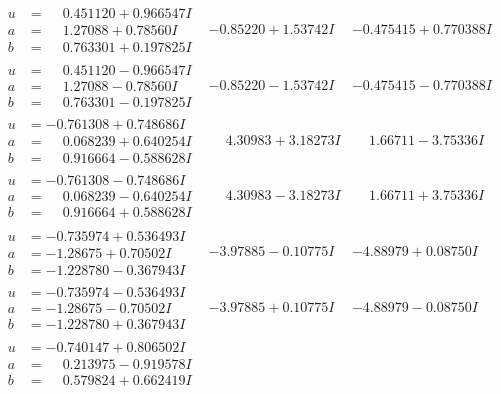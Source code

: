 \documentclass[1p]{elsarticle_modified}
\theoremstyle{definition}
\begin{document}
$$\begin{array}{c|c|c}
\begin{aligned}
u &= \phantom{-}0.451120 + 0.966547 I \\
a &= \phantom{-}1.27088 + 0.78560 I \\
b &= \phantom{-}0.763301 + 0.197825 I\end{aligned}
 & -0.85220 + 1.53742 I & -0.475415 + 0.770388 I \\ \hline\begin{aligned}
u &= \phantom{-}0.451120 - 0.966547 I \\
a &= \phantom{-}1.27088 - 0.78560 I \\
b &= \phantom{-}0.763301 - 0.197825 I\end{aligned}
 & -0.85220 - 1.53742 I & -0.475415 - 0.770388 I \\ \hline\begin{aligned}
u &= -0.761308 + 0.748686 I \\
a &= \phantom{-}0.068239 + 0.640254 I \\
b &= \phantom{-}0.916664 - 0.588628 I\end{aligned}
 & \phantom{-}4.30983 + 3.18273 I & \phantom{-}1.66711 - 3.75336 I \\ \hline\begin{aligned}
u &= -0.761308 - 0.748686 I \\
a &= \phantom{-}0.068239 - 0.640254 I \\
b &= \phantom{-}0.916664 + 0.588628 I\end{aligned}
 & \phantom{-}4.30983 - 3.18273 I & \phantom{-}1.66711 + 3.75336 I \\ \hline\begin{aligned}
u &= -0.735974 + 0.536493 I \\
a &= -1.28675 + 0.70502 I \\
b &= -1.228780 - 0.367943 I\end{aligned}
 & -3.97885 - 0.10775 I & -4.88979 + 0.08750 I \\ \hline\begin{aligned}
u &= -0.735974 - 0.536493 I \\
a &= -1.28675 - 0.70502 I \\
b &= -1.228780 + 0.367943 I\end{aligned}
 & -3.97885 + 0.10775 I & -4.88979 - 0.08750 I \\ \hline\begin{aligned}
u &= -0.740147 + 0.806502 I \\
a &= \phantom{-}0.213975 - 0.919578 I \\
b &= \phantom{-}0.579824 + 0.662419 I\end{aligned}

\end{array}$$
\end{document}

